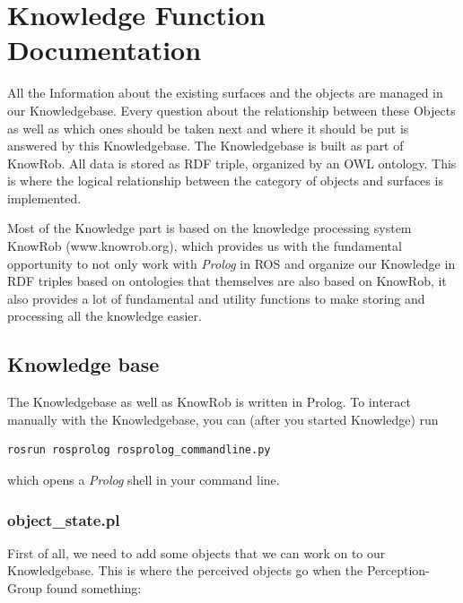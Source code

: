 \documentclass[main.tex]{subfiles}
\begin{document}
	\begingroup

	\renewcommand{\cleardoublepage}{}

	\renewcommand{\clearpage}{}

	\chapter{Knowledge Function Documentation}


All the Information about the existing surfaces and the objects are managed in our Knowledgebase. Every question about the relationship between these Objects as well as which ones should be taken next and where it should be put is answered by this Knowledgebase.  The Knowledgebase is built as part of KnowRob. All data is stored as RDF triple, organized by an OWL ontology. This is where the logical relationship between the category of objects and surfaces is implemented.

Most of the Knowledge part is based on the knowledge processing system KnowRob (www.knowrob.org), which provides us with the fundamental opportunity to not only work with \textit{Prolog} in ROS and organize our Knowledge in RDF triples based on ontologies that themselves are also based on KnowRob, it also provides a lot of fundamental and utility functions to make storing and processing all the knowledge easier. 
		
\section{Knowledge base}

The Knowledgebase as well as KnowRob is written in Prolog. To interact manually with the Knowledgebase, you can (after you started Knowledge) run
\begin{lstlisting}
rosrun rosprolog rosprolog_commandline.py
\end{lstlisting}
which opens a \textit{Prolog} shell in your command line.

\subsection{object\_state.pl}

First of all, we need to add some objects that we can work on to our Knowledgebase. This is where the perceived objects go when the Perception-Group found something:
\end{document}
